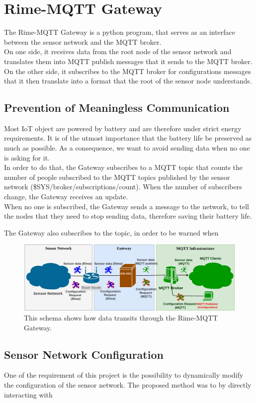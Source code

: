 \documentclass[a4paper,11pt]{article}
\begin{document}
\section{Rime-MQTT Gateway}
The Rime-MQTT Gateway is a python program, that serves as an interface between the sensor network and the MQTT broker.\\

On one side, it receives data from the root node of the sensor network and translates them into MQTT publish messages that it sends to the MQTT broker. On the other side, it subscribes to the MQTT broker for configurations messages that it then translate into a format that the root of the sensor node understands.\\

\subsection{Prevention of Meaningless Communication}
Most IoT object are powered by battery and are therefore under strict energy requirements. It is of the utmost importance that the battery life be preserved as much as possible. As a consequence, we want to avoid sending data when no one is asking for it.\\

In order to do that, the Gateway subscribes to a MQTT topic that counts the number of people subscribed to the MQTT topics published by the sensor network (\$SYS/broker/subscriptions/count). When the number of subscribers change, the Gateway receives an update.\\

When no one is subscribed, the Gateway sends a message to the network, to tell the nodes that they need to stop sending data, therefore saving their battery life.

The Gateway also subscribes to the  topic, in order to be warned when 

\begin{figure}
  \includegraphics[width=\linewidth]{img/communication-2.jpg}
  \caption{This schema shows how data transits through the Rime-MQTT Gateway.}
  \label{fig:communication1}
\end{figure}

\subsection{Sensor Network Configuration}
One of the requirement of this project is the possibility to dynamically modify the configuration of the sensor network. The proposed method was to by directly interacting with 
\end{document}
